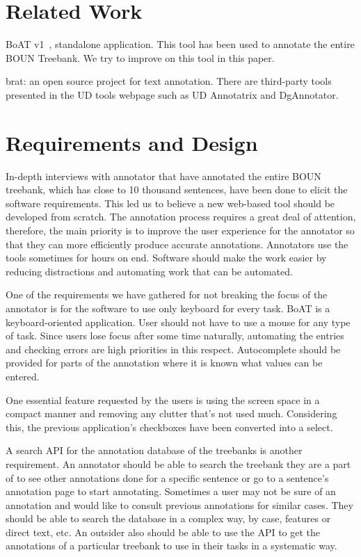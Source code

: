 \documentclass[
]{ceurart}
\begin{document}
\section{Related Work}
\label{sec:related}

BoAT v1~\cite{turk-etal-2019-turkish}, standalone application.
This tool has been used to annotate the entire BOUN Treebank.
We try to improve on this tool in this paper.

brat: an open source project for text annotation.\cite{brat}
There are third-party tools presented in the UD tools webpage such as UD Annotatrix\cite{tyers-etal:2018} and DgAnnotator\cite{dgannotator}.

\section{Requirements and Design}
\label{sec:requirements}

In-depth interviews with annotator that have annotated the entire BOUN treebank, which has close to 10 thousand sentences, have been done to elicit the software requirements.
This led us to believe a new web-based tool should be developed from scratch.
The annotation process requires a great deal of attention, therefore, the main priority is to improve the user experience for the annotator so that they can more efficiently produce accurate annotations.
Annotators use the tools sometimes for hours on end.
Software should make the work easier by reducing distractions and automating work that can be automated.

One of the requirements we have gathered for not breaking the focus of the annotator is for the software to use only keyboard for every task.
BoAT is a keyboard-oriented application.
User should not have to use a mouse for any type of task.
Since users lose focus after some time naturally, automating the entries and checking errors are high priorities in this respect.
Autocomplete should be provided for parts of the annotation where it is known what values can be entered.

One essential feature requested by the users is using the screen space in a compact manner and removing any clutter that's not used much.
Considering this, the previous application's checkboxes have been converted into a select.

A search API for the annotation database of the treebanks is another requirement.
An annotator should be able to search the treebank they are a part of to see other annotations done for a specific sentence or go to a sentence's annotation page to start annotating.
Sometimes a user may not be sure of an annotation and would like to consult previous annotations for similar cases.
They should be able to search the database in a complex way, by case, features or direct text, etc.
An outsider also should be able to use the API to get the annotations of a particular treebank to use in their tasks in a systematic way.
\end{document}
